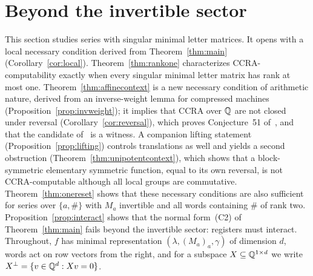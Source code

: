 \providecommand{\cZ}{\mathcal{Z}}
\section{Beyond the invertible sector}\label{sec:singular}
This section studies series with singular minimal letter matrices. It opens with a local necessary condition derived from Theorem~\ref{thm:main} (Corollary~\ref{cor:local}). Theorem~\ref{thm:rankone} characterizes CCRA-computability exactly when every singular minimal letter matrix has rank at most one. Theorem~\ref{thm:affinecontext} is a new necessary condition of arithmetic nature, derived from an inverse-weight lemma for compressed machines (Proposition~\ref{prop:invweight}); it implies that CCRA over $\mathbb{Q}$ are not closed under reversal (Corollary~\ref{cor:reversal}), which proves Conjecture~51 of~\cite{MPSfull}, and that the candidate of~\cite[Example~52]{MPSfull} is a witness. A companion lifting statement (Proposition~\ref{prop:lifting}) controls translations as well and yields a second obstruction (Theorem~\ref{thm:unipotentcontext}), which shows that a block-symmetric elementary symmetric function, equal to its own reversal, is not CCRA-computable although all local groups are commutative. Theorem~\ref{thm:onereset} shows that these necessary conditions are also sufficient for series over $\{a,\#\}$ with $M_a$ invertible and all words containing $\#$ of rank two. Proposition~\ref{prop:interact} shows that the normal form~(C2) of Theorem~\ref{thm:main} fails beyond the invertible sector: registers must interact. Throughout, $f$ has minimal representation $(\lambda,(M_a)_a,\gamma)$ of dimension $d$, words act on row vectors from the right, and for a subspace $X\subseteq\mathbb{Q}^{1\times d}$ we write $X^\perp=\{v\in\mathbb{Q}^d:Xv=0\}$.

